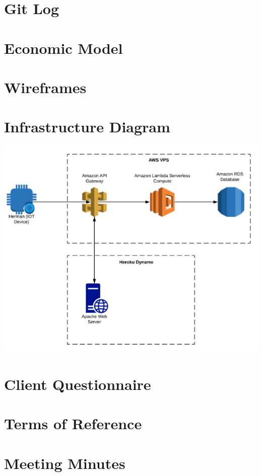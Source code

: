 \documentclass[]{report}
\begin{document}
	
	
	\newpage
	\begin{appendices}
		\chapter{Git Log}
		\label{appendix:gitlog}
		
		\chapter{Economic Model}
		\label{appendix:economicmodel}
		
		\chapter{Wireframes}
		\label{appendix:wireframes}
		
		\chapter{Infrastructure Diagram}
		\label{appendix:infrastructurediagram}
		\includegraphics{awsmodel.png}
		\chapter{Client Questionnaire}
		\label{appendix:questionnaire}
		
		\chapter{Terms of Reference}
		\label{appendix:tor}
		
		\chapter{Meeting Minutes}
		\label{appendix:meetingsMinutes}
		
	\end{appendices}
\end{document}
